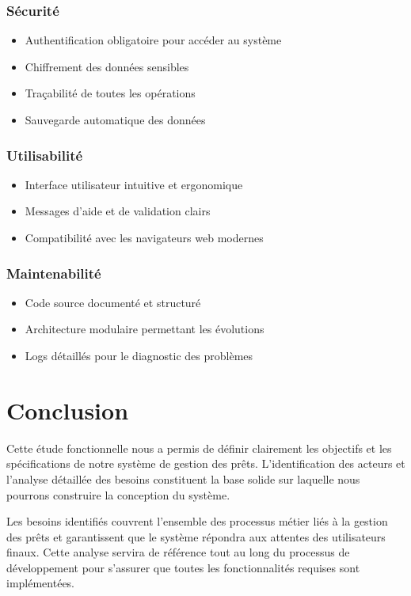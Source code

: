 \documentclass[12pt,a4paper]{report}
\begin{document}
\subsubsection{Sécurité}
\begin{itemize}
    \item Authentification obligatoire pour accéder au système
    \item Chiffrement des données sensibles
    \item Traçabilité de toutes les opérations
    \item Sauvegarde automatique des données
\end{itemize}

\subsubsection{Utilisabilité}
\begin{itemize}
    \item Interface utilisateur intuitive et ergonomique
    \item Messages d'aide et de validation clairs
    \item Compatibilité avec les navigateurs web modernes
\end{itemize}

\subsubsection{Maintenabilité}
\begin{itemize}
    \item Code source documenté et structuré
    \item Architecture modulaire permettant les évolutions
    \item Logs détaillés pour le diagnostic des problèmes
\end{itemize}

\section{Conclusion}

Cette étude fonctionnelle nous a permis de définir clairement les objectifs et les spécifications de notre système de gestion des prêts. L'identification des acteurs et l'analyse détaillée des besoins constituent la base solide sur laquelle nous pourrons construire la conception du système.

Les besoins identifiés couvrent l'ensemble des processus métier liés à la gestion des prêts et garantissent que le système répondra aux attentes des utilisateurs finaux. Cette analyse servira de référence tout au long du processus de développement pour s'assurer que toutes les fonctionnalités requises sont implémentées.
\end{document}
